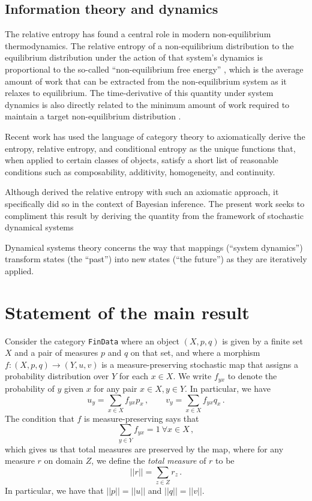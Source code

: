 \documentclass{article}
\begin{document}
{\subsection{Information theory and dynamics}

The relative entropy has found a central role in modern non-equilibrium thermodynamics. The relative entropy of a non-equilibrium distribution to the equilibrium distribution under the action of that system's dynamics is proportional to the so-called ``non-equilibrium free energy'' \cite{gaveauGeneralFrameworkNonequilibrium1997, shawDrippingFaucetModel1984}, which is the average amount of work that can be extracted from the non-equilibrium system as it relaxes to equilibrium. The time-derivative of this quantity under system dynamics is also directly related to the minimum amount of work required to maintain a target non-equilibrium distribution \cite{horowitzMinimumEnergeticCost2017}.

Recent work \cite{baezCharacterizationEntropyTerms2011, baezBayesianCharacterizationRelative2014, fullwoodInformationLossStochastic2021} has used the language of category theory to axiomatically derive the entropy, relative entropy, and conditional entropy as the unique functions that, when applied to certain classes of objects, satisfy a short list of reasonable conditions such as composability, additivity, homogeneity, and continuity.

Although \cite{baezBayesianCharacterizationRelative2014} derived the relative entropy with such an axiomatic approach, it specifically did so in the context of Bayesian inference. The present work seeks to compliment this result by deriving the quantity from the framework of stochastic dynamical systems

Dynamical systems theory concerns the way that mappings (``system dynamics'') transform states (the ``past'') into new states (``the future'') as they are iteratively applied. 

\section{Statement of the main result}
Consider the category \texttt{FinData} where an object $(X, p, q)$ is given by a finite set $X$ and a pair of measures $p$ and $q$ on that set, and where a morphism $f:(X, p, q) \rightarrow (Y, u, v)$ is a measure-preserving stochastic map that assigns a probability distribution over $Y$ for each $x\in X$. We write $f_{yx}$ to denote the probability of $y$ given $x$ for any pair $x\in X, y\in Y$. In particular, we have
$$
u_y = \sum_{x\in X} f_{yx}p_x\,,
\qquad v_y = \sum_{x\in X} f_{yx}q_x\,.
$$
The condition that $f$ is measure-preserving says that 
$$
    \sum_{y\in Y} f_{yx} = 1 \ \forall x\in X\,,
$$
which gives us that total measures are preserved by the map, where for any measure $r$ on domain $Z$, we define the \textit{total measure} of $r$ to be
$$
||r|| = \sum_{z\in Z} r_z\,.
$$
In particular, we have that $||p|| = ||u||$ and $||q|| = ||v||$.

}
\end{document}
